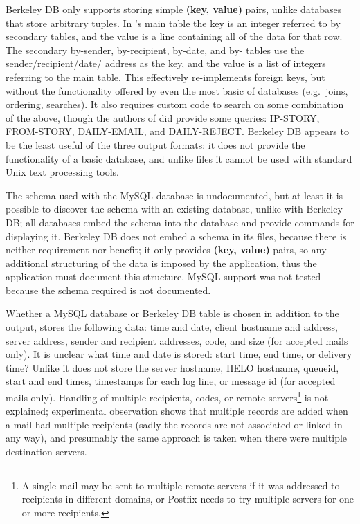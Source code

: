 Berkeley DB only supports storing simple \textbf{(key, value)} pairs,
unlike  databases that store arbitrary tuples.  In
's main table the key is an integer referred to by secondary
tables, and the value is a  line containing all of the data
for that row.  The secondary by-sender, by-recipient, by-date, and
by- tables use the sender/recipient/date/ address
as the key, and the value is a  list of integers referring to
the main table.  This effectively re-implements  foreign keys,
but without the functionality offered by even the most basic of
 databases (e.g.\ joins, ordering, searches).  It also
requires custom code to search on some combination of the above, though the
authors of  did provide some queries: IP-STORY, FROM-STORY,
DAILY-EMAIL, and DAILY-REJECT\@.  Berkeley DB appears to be the least
useful of the three output formats: it does not provide the functionality
of a basic  database, and unlike  files it cannot
be used with standard Unix text processing tools.

The schema used with the MySQL database is undocumented, but at least it is
possible to discover the schema with an existing  database,
unlike with Berkeley DB\@; all  databases embed the schema
into the database and provide commands for displaying it.  Berkeley DB does
not embed a schema in its files, because there is neither requirement nor
benefit; it only provides \textbf{(key, value)} pairs, so any additional
structuring of the data is imposed by the application, thus the application
must document this structure.  MySQL support was not tested because the
schema required is not documented.

Whether a MySQL database or Berkeley DB table is chosen in addition to the
 output,  stores the following data: time and
date, client hostname and  address, server 
address, sender and recipient addresses,  code, and size (for
accepted mails only).  It is unclear what time and date is stored: start
time, end time, or delivery time?  Unlike \parsername{} it does not store
the server hostname, HELO hostname, queueid, start and end times,
timestamps for each log line, or message id (for accepted mails only).
Handling of multiple recipients,  codes, or remote
servers\footnote{A single mail may be sent to multiple remote servers if it
was addressed to recipients in different domains, or Postfix needs to try
multiple servers for one or more recipients.} is not explained;
experimental observation shows that multiple records are added when a mail
had multiple recipients (sadly the records are not associated or linked in
any way), and presumably the same approach is taken when there were
multiple destination servers.

